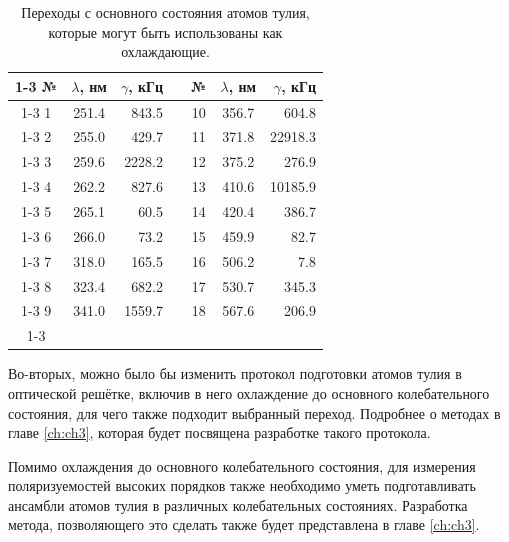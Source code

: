 \begin{table}[]
	\centering
	\begin{tabular}{|c|c|r|c|c|c|r|}
		\cline{1-3} \cline{5-7}
		№ & $\lambda$, нм & $\gamma$, кГц & \multirow{11}{*}{   } &№ & $\lambda$, нм & $\gamma$, кГц\\
		\cline{1-3} \cline{5-7}
		1 & 251.4 & 843.5  && 10 & 356.7 & 604.8 \\
		\cline{1-3} \cline{5-7}
		2 & 255.0 & 429.7  && 11 & 371.8 & 22918.3 \\
		\cline{1-3} \cline{5-7}
		3 & 259.6 & 2228.2  && 12 & 375.2 & 276.9 \\
		\cline{1-3} \cline{5-7}
		4 & 262.2 & 827.6 && 13 & 410.6 & 10185.9 \\
		\cline{1-3} \cline{5-7}
		5 & 265.1 & 60.5 && 14 & 420.4 & 386.7 \\
		\cline{1-3} \cline{5-7}
		6 & 266.0 & 73.2 && 15 & 459.9 & 82.7 \\
		\cline{1-3} \cline{5-7}
		7 & 318.0 & 165.5 && 16 & 506.2 & 7.8 \\
		\cline{1-3} \cline{5-7}
		8 & 323.4 & 682.2 && 17 & 530.7 & 345.3 \\
		\cline{1-3} \cline{5-7}
		9 & 341.0 & 1559.7 && 18 & 567.6 & 206.9 \\
		\cline{1-3} \cline{5-7}
	\end{tabular}
	\caption{Переходы с основного состояния атомов тулия, которые могут быть использованы как охлаждающие.}
	\label{tab:Transitions}
\end{table}

Во-вторых, можно было бы изменить протокол подготовки атомов тулия в оптической решётке, включив в него охлаждение до основного колебательного состояния, для чего также подходит выбранный переход.
Подробнее о методах в главе \ref{ch:ch3}, которая будет посвящена разработке такого протокола.

Помимо охлаждения до основного колебательного состояния, для измерения поляризуемостей высоких порядков также необходимо уметь подготавливать ансамбли атомов тулия в различных колебательных состояниях. 
Разработка метода, позволяющего это сделать также будет представлена в главе \ref{ch:ch3}.